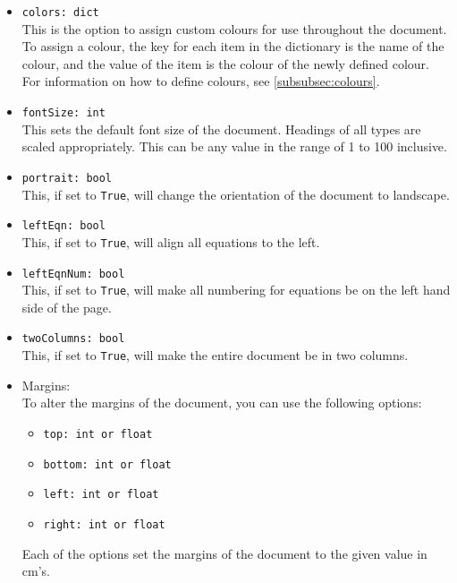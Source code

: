 \documentclass{article}
\begin{document}
\begin{itemize}
\item \verb|colors: dict|\\
This is the option to assign custom colours for use throughout the document. To assign a colour, the key for each item in the dictionary is the name of the colour, and the value of the item is the colour of the newly defined colour. For information on how to define colours, see \autoref{subsubsec:colours}.
\item \verb|fontSize: int|\\
This sets the default font size of the document. Headings of all types are scaled appropriately. This can be any value in the range of 1 to 100 inclusive.
\item \verb|portrait: bool|\\
This, if set to \verb|True|, will change the orientation of the document to landscape.
\item \verb|leftEqn: bool|\\
This, if set to \verb|True|, will align all equations to the left.
\item \verb|leftEqnNum: bool|\\
This, if set to \verb|True|, will make all numbering for equations be on the left hand side of the page.
\item \verb|twoColumns: bool|\\
This, if set to \verb|True|, will make the entire document be in two columns.
\item Margins:\\
To alter the margins of the document, you can use the following options:\begin{itemize}
\item \verb|top: int or float|
\item \verb|bottom: int or float|
\item \verb|left: int or float|
\item \verb|right: int or float|
\end{itemize}
Each of the options set the margins of the document to the given value in cm's.
\end{itemize}
\end{document}
